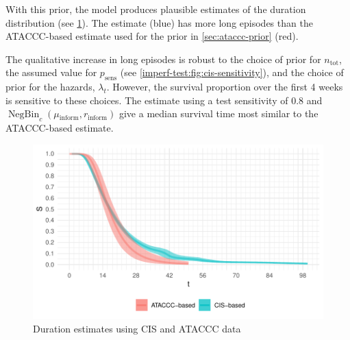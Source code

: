 \documentclass[12pt]{article}
\DeclareMathOperator{\NBr}{NegBin}
\newcommand{\NBc}{\NBr_{c}}
\newcommand{\psens}{p_\text{sens}}
\newcommand{\ntot}{n_\text{tot}}
\newcommand{\inform}{{_{\text{inform}}}}
\begin{document}
With this prior, the model produces plausible estimates of the duration distribution (see \cref{imperf-test:fig:cis-estimates}).
The estimate (blue) has more long episodes than the ATACCC-based estimate used for the prior in \cref{sec:ataccc-prior} (red).

The qualitative increase in long episodes is robust to the choice of prior for $\ntot$, the assumed value for $\psens$ (see \cref{imperf-test:fig:cis-sensitivity}), and the choice of prior for the hazards, $\lambda_t$.
However, the survival proportion over the first 4 weeks is sensitive to these choices.
The estimate using a test sensitivity of 0.8 and $\NBc(\mu\inform, r\inform)$ give a median survival time most similar to the ATACCC-based estimate.
\begin{figure}
  \centering \includegraphics{figures/output/CIS_final}
  \caption{Duration estimates using CIS and ATACCC data}
  \label{imperf-test:fig:cis-estimates}
\end{figure}
\end{document}
